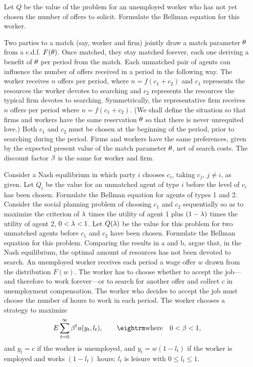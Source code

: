Let $Q$ be the value of the problem for an unemployed worker
who has not yet chosen the number of offers to solicit.  Formulate
the Bellman equation for this worker.

\medskip
{}
\medskip
\noindent Two parties to a match (say, worker and firm) jointly draw a match parameter
${\theta}$ from a c.d.f. $F({\theta})$.  Once matched, they stay matched forever, each
one deriving a benefit of ${\theta}$ per period from the match.  Each unmatched
pair of agents can influence the number of offers received in a period in the
following way.   The worker receives $n$ offers per period, where
$n=f(c_1+c_2)$ and $c_1$ represents
the resources the worker devotes to searching
and $c_2$ represents the resources the typical firm  devotes to searching.
Symmetrically, the representative firm receives $n$ offers per period where
$n=f(c_1+c_2)$.  (We shall define the situation so that firms and workers have
the same reservation ${\theta}$ so that there is never unrequited love.)  Both $c_1$
and $c_2$ must be chosen at the beginning of the period, prior to searching
during the period.  Firms and workers have the same preferences, given by the
expected present value of the match parameter ${\theta}$, net of search costs.  The
discount factor ${\beta}$ is the same for worker and firm.

\medskip{}
  Consider a Nash equilibrium in which party $i$ chooses $c_i$, taking
$c_j$, $j\not=i$, as given.  Let $Q_i$ be the value for an unmatched agent of
type $i$ before the level of $c_i$ has been chosen.  Formulate the Bellman
equation for agents of types 1 and 2.
\medskip{} Consider the social planning problem of choosing $c_1$ and $c_2$
sequentially so as to maximize the criterion of $\lambda$ times the utility of
agent 1 plus $(1-\lambda)$ times the utility of agent 2, $0<\lambda <1$.  Let $Q(\lambda)$
be the value for this problem for two unmatched agents before $c_1$ and $c_2$
have been chosen.  Formulate the Bellman equation for this problem.
\medskip{} Comparing the results in a and b, argue that, in the Nash
equilibrium, the optimal amount of resources has not been devoted to search.
\medskip
{}
\medskip
\noindent An unemployed worker receives each period a wage offer $w$ drawn from the
distribution $F(w)$.  The worker has to choose whether to accept the job---and
therefore to work forever---or to search for another offer and collect $c$ in
unemployment compensation.  The worker who decides to accept the job must
choose the number of hours to work in each period.  The worker chooses a
strategy to maximize
$$E\sum_{t=0}^\infty \be^t u(y_t,l_t),\qquad {\rm where}\quad 0<\be<1,$$
and $y_t=c$ if the worker is unemployed, and $y_t=w(1-l_t)$ if the worker is
employed and works $(1-l_t)$ hours; $l_t$ is leisure with $0\le l_t\le 1$.

